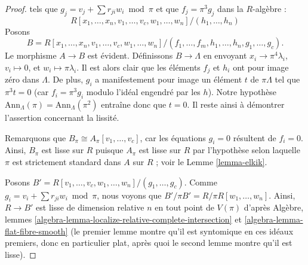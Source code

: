 \begin{proof}
tels que $g_j = v_j + \sum r_{ji}w_i \bmod \pi$
et que $f_j = \pi^3 g_j$ dans la $R$-algèbre :
$$
R[x_1, \ldots, x_n, v_1, \ldots, v_c, w_1, \ldots, w_n]/
(h_1, \ldots, h_n)
$$
Posons
$$
B = R[x_1, \ldots, x_n, v_1, \ldots, v_c, w_1, \ldots, w_n]/
(f_1, \ldots, f_m, h_1, \ldots, h_n, g_1, \ldots, g_c).
$$
Le morphisme $A \to B$ est évident. Définissons $B \to \Lambda$ en envoyant
$x_i \to \pi^4\lambda_i$, $v_i \mapsto 0$, et $w_i \mapsto \pi \lambda_i$.
Il est alors clair que les éléments $f_j$ et $h_i$ ont pour image zéro
dans $\Lambda$. De plus, $g_i$ a manifestement pour image un élément
$t$ de $\pi\Lambda$ tel que $\pi^3t = 0$ (car $f_i = \pi^3 g_i$ modulo
l'idéal engendré par les $h$). Notre hypothèse
$\text{Ann}_\Lambda(\pi) = \text{Ann}_\Lambda(\pi^2)$ entraîne donc que $t = 0$.
Il reste ainsi à démontrer l'assertion concernant la lissité.

\medskip\noindent
Remarquons que $B_\pi \cong A_\pi[v_1, \ldots, v_c]$, car les équations
$g_i = 0$ résultent de $f_i = 0$. Ainsi, $B_\pi$ est lisse sur $R$
puisque $A_\pi$ est lisse sur $R$ par l'hypothèse selon laquelle $\pi$ est
strictement standard dans $A$ sur $R$ ; voir le
Lemme \ref{lemma-elkik}.

\medskip\noindent
Posons $B' = R[v_1, \ldots, v_c, w_1, \ldots, w_n]/(g_1, \ldots, g_c)$.
Comme $g_i = v_i + \sum r_{ji}w_i \bmod \pi$, nous voyons que
$B'/\pi B' = R/\pi R[w_1, \ldots, w_n]$. Ainsi,
$R \to B'$ est lisse de dimension relative $n$ en tout
point de $V(\pi)$ d'après
Algèbre, lemmes
\ref{algebra-lemma-localize-relative-complete-intersection} et
\ref{algebra-lemma-flat-fibre-smooth}
(le premier lemme montre qu'il est syntomique en ces idéaux premiers, donc en particulier
plat, après quoi le second lemme montre qu'il est lisse).


\end{proof}
